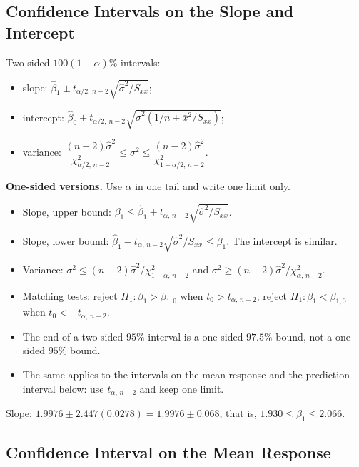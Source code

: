\subsection{Confidence Intervals on the Slope and Intercept}

\begin{theorem}\label{thm:regci}
Two-sided $100(1-\alpha)\%$ intervals:
\begin{itemize}
  \item slope: $\hat\beta_1\pm t_{\alpha/2,\,n-2}\sqrt{\hat\sigma^2/S_{xx}}$;
  \item intercept: $\hat\beta_0\pm t_{\alpha/2,\,n-2}\sqrt{\hat\sigma^2(1/n+\bar{x}^2/S_{xx})}$;
  \item variance: $\dfrac{(n-2)\hat\sigma^2}{\chi^2_{\alpha/2,\,n-2}}\le\sigma^2\le\dfrac{(n-2)\hat\sigma^2}{\chi^2_{1-\alpha/2,\,n-2}}$.
\end{itemize}
\end{theorem}

\textbf{One-sided versions.} Use $\alpha$ in one tail and write one limit only.
\begin{itemize}
  \item Slope, upper bound: $\beta_1\le\hat\beta_1+t_{\alpha,\,n-2}\sqrt{\hat\sigma^2/S_{xx}}$.
  \item Slope, lower bound: $\hat\beta_1-t_{\alpha,\,n-2}\sqrt{\hat\sigma^2/S_{xx}}\le\beta_1$. The intercept is similar.
  \item Variance: $\sigma^2\le(n-2)\hat\sigma^2/\chi^2_{1-\alpha,\,n-2}$ and $\sigma^2\ge(n-2)\hat\sigma^2/\chi^2_{\alpha,\,n-2}$.
  \item Matching tests: reject $H_1:\beta_1>\beta_{1,0}$ when $t_0>t_{\alpha,\,n-2}$; reject $H_1:\beta_1<\beta_{1,0}$ when $t_0<-t_{\alpha,\,n-2}$.
  \item The end of a two-sided $95\%$ interval is a one-sided $97.5\%$ bound, not a one-sided $95\%$ bound.
  \item The same applies to the intervals on the mean response and the prediction interval below: use $t_{\alpha,\,n-2}$ and keep one limit.
\end{itemize}

\begin{example}
Slope: $1.9976\pm2.447(0.0278)=1.9976\pm0.068$, that is, $1.930\le\beta_1\le2.066$.
\end{example}

\subsection{Confidence Interval on the Mean Response}

